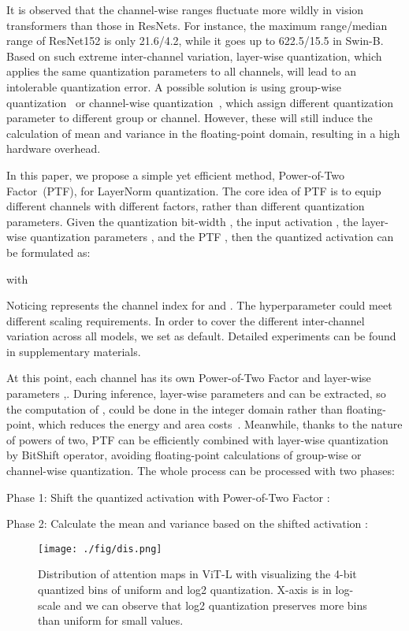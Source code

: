 \documentclass{article}
\begin{document}
It is observed that the channel-wise ranges fluctuate more wildly in vision transformers than those in ResNets. For instance, the maximum range/median range of ResNet152 is only 21.6/4.2, while it goes up to 622.5/15.5 in Swin-B.
Based on such extreme inter-channel variation, layer-wise quantization, which applies the same quantization parameters to all channels, will lead to an intolerable quantization error. A possible solution is using group-wise quantization~\cite{shen2020q} or channel-wise quantization~\cite{li2019fully}, which assign different quantization parameter to different group or channel. However, these will still induce the calculation of mean and variance in the floating-point domain, resulting in a high hardware overhead.

In this paper, we propose a simple yet efficient method, Power-of-Two Factor~(PTF), for LayerNorm quantization. The core idea of PTF is to equip different channels with different factors, rather than different quantization parameters. Given the quantization bit-width , the input activation , the layer-wise quantization parameters , and the PTF , then the quantized activation  can be formulated as:

with



Noticing  represents the channel index for  and . The hyperparameter  could meet different scaling requirements. In order to cover the different inter-channel variation across all models, we set  as default. Detailed experiments can be found in supplementary materials.

At this point, each channel has its own Power-of-Two Factor  and layer-wise parameters ,. 
During inference, layer-wise parameters  and  can be extracted, so the computation of , could be done in the integer domain rather than floating-point, which reduces the energy and area costs~\cite{8716697}. Meanwhile, thanks to the nature of powers of two, PTF  can be efficiently combined with layer-wise quantization by BitShift operator, avoiding floating-point calculations of 
group-wise or channel-wise quantization. The whole process can be processed with two phases:

Phase 1: Shift the quantized activation with Power-of-Two Factor :


Phase 2: Calculate the mean and variance based on the shifted activation :



\begin{figure}[t]
\centering
\texttt{[image: ./fig/dis.png]}
\caption{Distribution of attention maps in ViT-L with visualizing the 4-bit quantized bins of uniform and log2 quantization. X-axis is in log-scale and we can observe that log2 quantization preserves more bins than uniform for small values.}
\label{fig:sm_dis} 
\end{figure}
\end{document}
